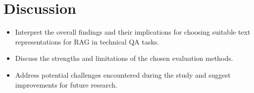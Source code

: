 
\chapter{Discussion\label{chap:discussion}}

\begin{itemize}
    \item Interpret the overall findings and their implications for choosing suitable text representations for RAG in technical QA tasks.
    \item Discuss the strengths and limitations of the chosen evaluation methods.
    \item Address potential challenges encountered during the study and suggest improvements for future research.
\end{itemize}




